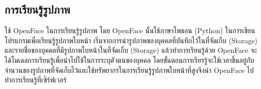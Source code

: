 \subsection{การเรียนรู้รูปภาพ}
ใช้ OpenFace ในการเรียนรู้รูปภาพ โดย OpenFace นั้นใช้ภาษาไพธอน (Python) ในการเขียนโปรแกรมเพื่อเรียนรู้รูปภาพใบหน้า เริ่มจากการนำรูปภาพของบุคคลที่บันทึกไว้ในที่จัดเก็บ (Storage) 
และรายชื่อของบุคคลที่มีรูปภาพใบหน้าในที่จัดเก็บ (Storage) แล้วทำการเรียนรู้ด้วย OpenFace จะได้โมเดลการเรียนรู้เพื่อนำไปใช้ในการระบุตัวตนของบุคคล 
โดยขั้นตอนการเรียรรู้จะใช้เวลาขึ้นอยู่กับจำนวนของรูปภาพที่จัดเก็บไว้และใช้ทรัพยากรในการเรียนรู้รูปภาพใบหน้าที่สูงจึงนำ OpenFace ไปทำการเรียนรู้ที่เซิร์ฟเวอร์

